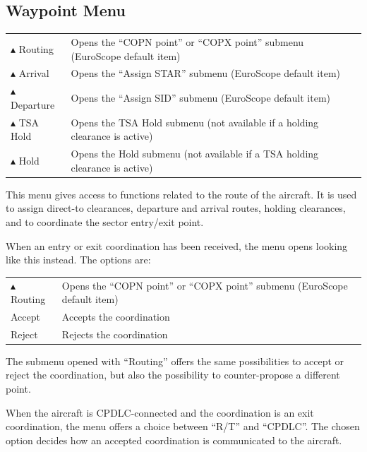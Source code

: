 \documentclass[a4paper,oneside,11pt]{memoir}
\begin{document}
\subsection{Waypoint Menu}
\label{menu:wpt}


\begin{longtable}{p{5cm} p{7.5cm}}
$\blacktriangle$  Routing & Opens the “COPN point” or “COPX point” submenu (EuroScope default item)\\
$\blacktriangle$ Arrival & Opens the “Assign STAR” submenu (EuroScope default item)\\
$\blacktriangle$ Departure & Opens the “Assign SID” submenu (EuroScope default item)\\
$\blacktriangle$ TSA Hold & Opens the TSA Hold submenu (not available if a holding clearance is active)\\
$\blacktriangle$ Hold & Opens the Hold submenu (not available if a TSA holding clearance is active)\\
\end{longtable}

\bigskip

This menu gives access to functions related to the route of the aircraft. It is used to assign direct-to clearances, departure and arrival routes, holding clearances, and to coordinate the sector entry/exit point.


When an entry or exit coordination has been received, the menu opens looking like this instead. The options are:

\begin{longtable}{p{5cm} p{7.5cm}}
$\blacktriangle$ Routing    & Opens the “COPN point” or “COPX point” submenu (EuroScope default item)
\\Accept                      & Accepts the coordination
\\Reject                      & Rejects the coordination
\end{longtable}

The submenu opened with “Routing” offers the same possibilities to accept or reject the coordination, but also the possibility to counter-propose a different point.


When the aircraft is CPDLC-connected and the coordination is an exit coordination, the menu offers a choice between “R/T” and “CPDLC”. The chosen option decides how an accepted coordination is communicated to the aircraft.
\end{document}
